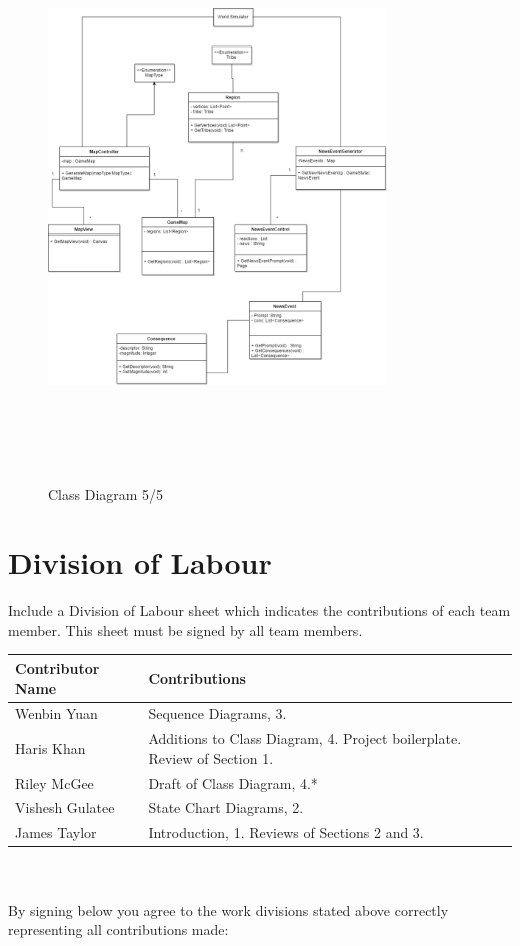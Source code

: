\documentclass[]{article}
\begin{document}
\pagebreak
\begin{figure}[h]
    \centering
    \includegraphics[width=0.8\textwidth , height=15cm, keepaspectratio]{dcdNM}
    \caption{Class Diagram 5/5}
    \label{fig:dcdTL}
\end{figure}

\newpage

\appendix
\section{Division of Labour}
\label{sec:division_of_labour}
Include a Division of Labour sheet which indicates the contributions of each team member. This sheet must be signed by all team members.


\begin{tabular}{ | l | l | }
\hline
	\textbf{Contributor Name} & \textbf{Contributions}  \\
  	\hline
  	Wenbin Yuan & Sequence Diagrams, 3.\\
  	\hline
  	Haris Khan & Additions to Class Diagram, 4. Project boilerplate. Review of Section 1. \\
  	\hline
	Riley McGee & Draft of Class Diagram, 4.* \\
  	\hline
	Vishesh Gulatee & State Chart Diagrams, 2. \\
  	\hline
	James Taylor & Introduction, 1. Reviews of Sections 2 and 3. \\
  	\hline
\end{tabular}
\\
\\
By signing below you agree to the work divisions stated above correctly representing all contributions made:
\end{document}
